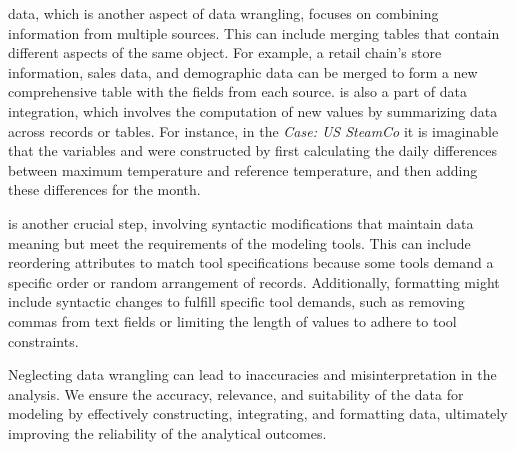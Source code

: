  data, which is another aspect of data wrangling, focuses on combining information from multiple sources. 
This can include merging tables that contain different aspects of the same object. For example, a retail chain's store information, sales data, and demographic data can be merged to form a new comprehensive table with the fields from each source. 
 is also a part of data integration, which involves the computation of new values by summarizing data across records or tables. 
For instance, in the \emph{Case: US SteamCo} it is imaginable that the variables  and  were constructed by first calculating the daily differences between maximum temperature and reference temperature, and then adding these differences for the month.

 is another crucial step, involving syntactic mod\-i\-fications that maintain data meaning but meet the requirements of the modeling tools. 
This can include reordering attributes to match tool specifications because some tools demand a specific order or random arrangement of records. 
Additionally, formatting might include syntactic changes to fulfill specific tool demands, such as removing commas from text fields or limiting the length of values to adhere to tool constraints.

Neglecting data wrangling can lead to inaccuracies and misinterpretation in the analysis. We ensure the accuracy, relevance, and suitability of the data for modeling by effectively constructing, integrating, and formatting data, ultimately improving the reliability of the analytical outcomes.










